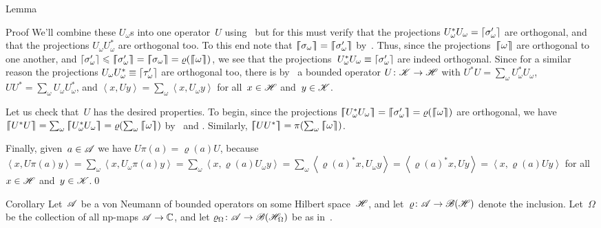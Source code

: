 \documentclass[a]{subfiles}
\begin{document}
\begin{parsec}
\begin{point}{Lemma}
\begin{point}{Proof}
We'll combine these $U_\omega$s into one operator~$U$
using~ but for this must
verify that the projections $U_\omega^* U_\omega=\left\lceil\sigma_\omega'\right\rceil$
are orthogonal,
and that the projections $U_\omega U_\omega^*$
are orthogonal too.
To this end note that
$\cceil{\sigma_\omega}=\cceil{\sigma_\omega'}$
by~.
Thus, since the projections~$\left\lceil\!\!\left\lceil\omega\right\rceil\!\!\right\rceil$
are orthogonal to one another,
and $\ceil{\sigma_\omega'}\leq \cceil{\sigma_\omega'}
= \cceil{\sigma_\omega} =\varrho(\cceil{\omega})$,
we see that the projections~$U^*_\omega U_\omega \equiv 
\left\lceil\sigma_\omega'\right\rceil$
are indeed orthogonal.
Since for a similar reason
the projections $U_\omega U_\omega^*
\equiv \left\lceil\tau_\omega'\right\rceil$ are orthogonal too,
there is by~
a bounded operator $U\colon \mathscr{K}\to\mathscr{H}$
with 
$U^*U = \sum_\omega U_\omega^* U_\omega$,
$UU^* = \sum_\omega U_\omega U_\omega^*$,
and $\left<x,Uy\right>=\sum_\omega \left<x,U_\omega y\right>$
for all~$x\in\mathscr{H}$ and~$y\in \mathscr{K}$.

Let us check that~$U$ has the desired properties.
To begin, since the projections
$\cceil{U_\omega^*U_\omega}=\cceil{\sigma_\omega'}=\varrho(\cceil{\omega})$
are orthogonal,
we have $\cceil{U^*U}=\sum_\omega \cceil{U_\omega^* U_\omega}
=  \varrho(\sum_\omega \cceil{\omega})$
by~ and
.
Similarly, $\cceil{UU^*}= \pi(\sum_\omega \cceil{\omega})$.

Finally,
given~$a\in\mathscr{A}$
we have $U\pi(a)=\varrho(a)U$,
because $\left<x,U\pi(a)y\right>
= \sum_\omega \left<x,U_\omega \pi(a)y\right>
= \sum_\omega \left<x,\varrho(a) U_\omega y\right>
= \sum_\omega \left<\varrho(a)^* x, U_\omega y\right>
= \left<\varrho(a)^* x, U y\right>
= \left<x, \varrho(a) U y\right>$
for all~$x\in\mathscr{H}$ and~$y\in\mathscr{K}$.\qed
\end{point}
\end{point}
\begin{point}{Corollary}%
Let~$\mathscr{A}$ be a von Neumann 
of bounded operators on some Hilbert space~$\mathscr{H}$,
and let~$\varrho\colon \mathscr{A}\to\mathscr{B}(\mathscr{H})$
denote the inclusion.
Let~$\Omega$ be the collection of all np-maps $\mathscr{A}\to\mathbb{C}$,
and let $\varrho_\Omega\colon \mathscr{A}\to\mathscr{B}(\mathscr{H}_\Omega)$
be as in~.


\end{point}
\end{parsec}
\end{document}
